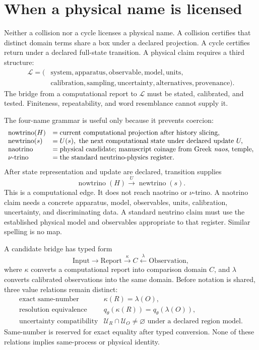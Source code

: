 \section{When a physical name is licensed}

Neither a collision nor a cycle licenses a physical name.  A collision certifies that distinct domain terms share a
box under a declared projection.  A cycle certifies return under a declared full-state transition.  A physical claim
requires a third structure:
\[
\begin{aligned}
\mathcal L=(&\text{system},\text{apparatus},\text{observable},\text{model},\text{units},\\
            &\text{calibration},\text{sampling},\text{uncertainty},\text{alternatives},\text{provenance}).
\end{aligned}
\]
The bridge from a computational report to \(\mathcal L\) must be stated, calibrated, and tested.  Finiteness,
repeatability, and word resemblance cannot supply it.

The four-name grammar is useful only because it prevents coercion:
\[
\begin{array}{ll}
\operatorname{nowtrino}(H)&=\text{current computational projection after history slicing},\\
\operatorname{newtrino}(s)&=U(s),\text{ the next computational state under declared update }U,\\
\operatorname{naotrino}&=\text{physical candidate; manuscript coinage from Greek \emph{naos}, temple},\\
\nu\text{-trino}&=\text{the standard neutrino-physics register}.
\end{array}
\]
After state representation and update are declared, transition supplies
\[
                    \operatorname{nowtrino}(H)\xrightarrow{\,U\,}\operatorname{newtrino}(s).
\]
This is a computational edge.  It does not reach naotrino or \(\nu\)-trino.  A naotrino claim needs a concrete
apparatus, model, observables, units, calibration, uncertainty, and discriminating data.  A standard neutrino claim
must use the established physical model and observables appropriate to that register.  Similar spelling is no map.

A candidate bridge has typed form
\[
\mathrm{Input}\longrightarrow\mathrm{Report}\xrightarrow{\kappa}C
\xleftarrow{\lambda}\mathrm{Observation},
\]
where \(\kappa\) converts a computational report into comparison domain \(C\), and \(\lambda\) converts calibrated
observations into the same domain.  Before notation is shared, three value relations remain distinct:
\[
\begin{array}{ll}
\text{exact same-number}&\kappa(R)=\lambda(O),\\
\text{resolution equivalence}&q_\theta(\kappa(R))=q_\theta(\lambda(O)),\\
\text{uncertainty compatibility}&\mathcal U_R\cap\mathcal U_O\ne\varnothing
\text{ under a declared region model}.
\end{array}
\]
Same-number is reserved for exact equality after typed conversion.  None of these relations implies same-process or
physical identity.

